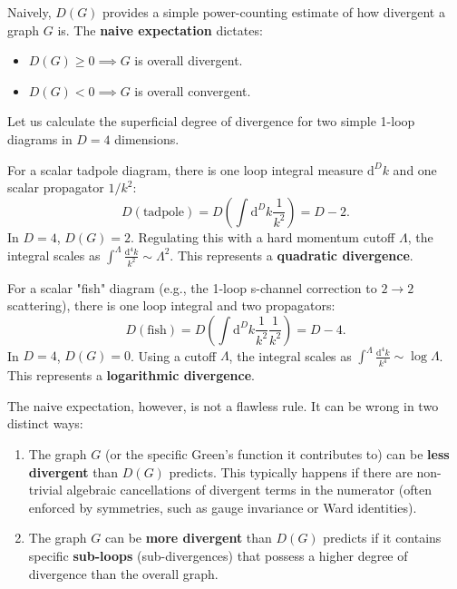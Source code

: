 Naively, $D(G)$ provides a simple power-counting estimate of how divergent a graph $G$ is. The \textbf{naive expectation} dictates:
\begin{itemize}
    \item $D(G) \ge 0 \implies G$ is overall divergent.
    \item $D(G) < 0 \implies G$ is overall convergent.
\end{itemize}

\begin{example}[Feynman Graphs in $D=4$]
    Let us calculate the superficial degree of divergence for two simple 1-loop diagrams in $D=4$ dimensions.

    For a scalar tadpole diagram, there is one loop integral measure $\mathrm{d}^D k$ and one scalar propagator $1/k^2$:
    \[
        D(\text{tadpole}) = D\left( \int \mathrm{d}^D k \frac{1}{k^2} \right) = D - 2.
    \]
    In $D=4$, $D(G) = 2$. Regulating this with a hard momentum cutoff $\Lambda$, the integral scales as $\int^\Lambda \frac{\mathrm{d}^4 k}{k^2} \sim \Lambda^2$. This represents a \textbf{quadratic divergence}.

    For a scalar "fish" diagram (e.g., the 1-loop s-channel correction to $2 \to 2$ scattering), there is one loop integral and two propagators:
    \[
        D(\text{fish}) = D\left( \int \mathrm{d}^D k \frac{1}{k^2} \frac{1}{k^2} \right) = D - 4.
    \]
    In $D=4$, $D(G) = 0$. Using a cutoff $\Lambda$, the integral scales as $\int^\Lambda \frac{\mathrm{d}^4 k}{k^4} \sim \log \Lambda$. This represents a \textbf{logarithmic divergence}.
\end{example}

The naive expectation, however, is not a flawless rule. It can be wrong in two distinct ways:
\begin{enumerate}
    \item The graph $G$ (or the specific Green's function it contributes to) can be \textbf{less divergent} than $D(G)$ predicts. This typically happens if there are non-trivial algebraic cancellations of divergent terms in the numerator (often enforced by symmetries, such as gauge invariance or Ward identities).
    \item The graph $G$ can be \textbf{more divergent} than $D(G)$ predicts if it contains specific \textbf{sub-loops} (sub-divergences) that possess a higher degree of divergence than the overall graph.
\end{enumerate}

